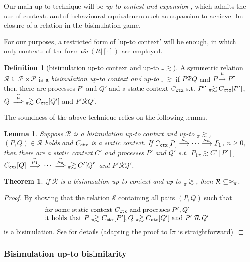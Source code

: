 \documentclass[11pt,a4paper]{amsart}
\theoremstyle{plain}
\theoremstyle{definition}
\theoremstyle{defC}
\theoremstyle{thmC}
\theoremstyle{plain}
\numberwithin{equation}{section}
\def\res#1{{\boldsymbol \nu} #1\:}   %
\newcommand{\pr}{{\mathcal P}}
\newcommand{\contexthole}{ [ \cdot  ] }      %
\newcommand{\ct}[1]{ C_{\rmm{ctx}} \brac{#1} }   %
\newcommand{\qct}{ C_{\rmm{ctx}}  }              %
\newcommand{\ctp}[1]{ C' \brac{#1} }   %
\newcommand{\qctp}{ C'  }              %
\newcommand{\brac}[1]{[#1] }   %
\newcommand{\rmm}[1]{{\tt{\lowercase{#1}}}}
\newcommand{\arr}[1]{\mathrel{\stackrel{{#1}}{\longrightarrow}}}  %
\newcommand{\Arcap}[1]{\:\stackrel{{\widehat{#1}}}{\Longrightarrow}\:}
\newcommand{\genwb}[1]{\mathrel{\approx_{\rmm{\lowercase{#1}}}}}       %
\newcommand{\wbPI}{\genwb{\pi}}       %
\newcommand{\contr}{\mathrel{\mbox{}_{\pi}\!\!\gtrsim}}
\def\R{{\mathcal R}}
\def\RR{\mathrel{\mathcal R}}
\def\S{{\mathcal S}}
\def\defi{\stackrel{\mbox{\scriptsize {\rm{def}}}}{=}} %
\def\st{\; : \;}
\newcommand{\tilc}{\tilde{c}}
\newcommand{\Intp}{\mbox{I$\pi$}\xspace}   %
\theoremstyle{plain}
\newtheorem{theorem}[thm]{Theorem}
\newtheorem{lemma}[thm]{Lemma}
\theoremstyle{definition}
\newtheorem{definition}[thm]{Definition}
\begin{document}
Our main up-to technique will be
{\em up-to context and expansion} \cite{San93c},
which admits the use of contexts and of behavioural equivalences such as 
expansion to achieve the
closure of a relation in the bisimulation game.

For our purposes, a restricted form of 'up-to context' will be enough,
in which only contexts of the form $\res \tilc (R   |  \contexthole)$ are
employed.


\begin{definition}[bisimulation up-to context and up-to $\contr$]
  \label{d:uptp_sce}
  A symmetric relation $  \R   \subseteq \pr \times \pr $ is a 
  {\em bisimulation up-to context and up-to $\contr$ }
  if $P \RR Q$ and 
  $P \arr\mu P''$
  then there are processes  $P'$ and $Q'$ 
  and a static context $\qct$
  s.t. $ P'' \contr \ct {P'}$, 
  $Q \Arcap\mu  \contr \ct{Q'}$ and 
  $P'  \RR  Q'$.
\end{definition}


The soundness of the above technique relies on the following lemma.
\begin{lemma}
\label{l:uptocon-expa}
Suppose $ \R $ is a bisimulation up-to context and up-to $\contr$,
 $(P, Q) \in  \R $ holds and  $\qct$ is a 
 static context. 
If  $\ct{P}\arr{\mu_1} \cdots\arr{\mu_n}  P_1$, $n\geq 0$,
 then
there are a static context $\qctp$ and processes $P'$ and $Q'$
s.t.\  $P_1 \contr \ctp{P'}$, $\ct Q \Arcap{\mu_1} \cdots
\Arcap{\mu_n} \contr \ctp{Q'}$ and $P'  \RR  Q'$. 
\end{lemma} 

\begin{theorem}
\label{t:up-to-con-expa}
If $ \R  $  is a 
bisimulation up-to context and up-to $\contr$, then $ \R  \subseteq \wbPI$.
\end{theorem} 
 
\begin{proof}
By showing that  
the relation $\S$ containing 
all pairs $(P,Q)$ such that 
\[ \begin{array}{l}
 \mbox{ for some static context $\qct$ and
processes $P', Q'$} \\
 \mbox{ it holds that } P \contr \ct{P'}, Q \contr \ct{Q'} \mbox{ and }
P'  \RR  Q' %
 \end{array}
 \]
is a bisimulation. 
See \cite{San93c} for details (adapting the proof to \Intp is
straightforward).
\end{proof}

\subsubsection{Bisimulation up-to bisimilarity}
\label{ss:bisimulation_upto_wb}
\end{document}
